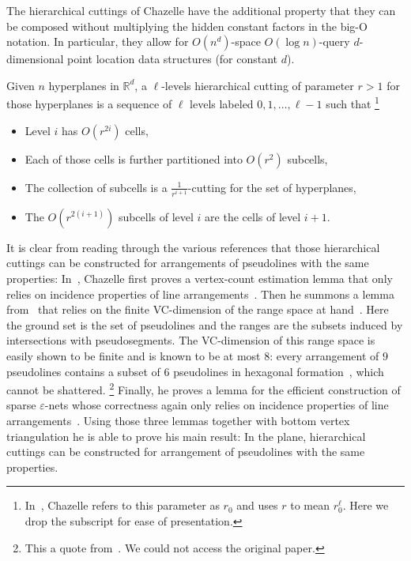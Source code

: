 The hierarchical cuttings of Chazelle
have the additional property that they can be composed without multiplying the
hidden constant factors in the big-O notation. In particular, they allow
for \(O(n^d)\)-space \(O(\log n)\)-query \(d\)-dimensional point location data
structures (for constant \(d\)).
\ifjournal
  \begin{definition}
    Given \(n\) hyperplanes in \(\mathbb{R}^d\),
    a \(\ell\)-levels hierarchical cutting of parameter \(r > 1\)
    for those hyperplanes
    is a sequence of \(\ell\) levels labeled \(0,1, \ldots, \ell - 1\)
    such that%
    \footnote{In~\cite{C93}, Chazelle refers to this parameter as
    \(r_0\) and uses \(r\) to mean \(r_0^\ell\). Here we drop the subscript for
    ease of presentation.}
    \begin{itemize}
      \item Level \(i\) has \(O(r^{2i})\) cells,
      \item Each of those cells is further partitioned into \(O(r^2)\)
        subcells,
      \item The collection of subcells is a \(\frac{1}{r^{i+1}}\)-cutting for
        the set of hyperplanes,
      \item The \(O(r^{2(i+1)})\) subcells of level \(i\) are the cells of level \(i+1\).
    \end{itemize}
  \end{definition}
  It is clear from reading through the various references that those
  hierarchical cuttings can be constructed for arrangements of pseudolines with
  the same properties:
  In~\cite{C93},
  Chazelle first proves a vertex-count estimation lemma
  that only relies on incidence properties of line
  arrangements~\cite[Lemma~2.1]{C93}. Then he summons a lemma from~\cite{Ma93}
  that relies on the finite VC-dimension of the range space at
  hand~\cite[Lemma~3.1]{C93}.
  Here the ground set is the set of pseudolines and the ranges are the
  subsets induced by intersections with pseudosegments.
  The VC-dimension of this range space
  is easily shown to be finite and is known to be at most
  \(8\): every arrangement of \(9\) pseudolines contains a subset of
  \(6\) pseudolines in hexagonal formation~\cite{HM94}, which cannot be
  shattered.%
  \footnote{This a quote from~\cite{BMP05}. We could not access
  the original paper.}
  Finally, he proves a lemma for the efficient construction of
  sparse \(\varepsilon\)-nets whose correctness again only relies on incidence
  properties of line arrangements~\cite[Lemma 3.2]{C93}.
  Using those three lemmas together with bottom vertex triangulation he is
  able to prove his main result:
\else%
In the plane, hierarchical cuttings can be
constructed for arrangement of pseudolines with the same properties.
\fi

